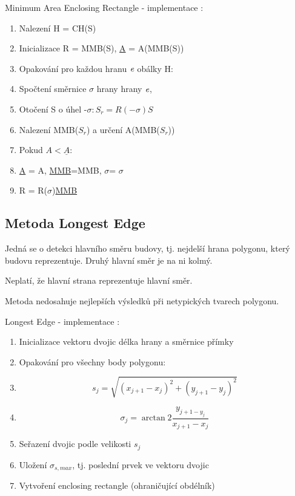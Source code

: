 \documentclass[oneside,12pt,a4paper]{book}
\begin{document}
\bigskip

Minimum Area Enclosing Rectangle - implementace $:$

\begin{enumerate}
\item Nalezení H = CH(S)
\item Inicializace R = MMB(S), \underline{A} = A(MMB(S))
\item Opakování pro každou hranu $\emph{e}$ obálky H:
\item \quad Spočtení směrnice $\sigma$ hrany hrany $\emph{e}$,
\item \quad Otočení S o úhel -$\sigma: S_r =R(-\sigma)S$
\item \quad Nalezení MMB($S_r$) a určení A(MMB($S_r$))
\item \quad Pokud $A < \underline{A}$:
\item \quad \quad \quad \underline{A} = A, \underline{MMB}=MMB, \underline{$\sigma$}= $\sigma$
\item R = R(\underline{$\sigma$})\underline{MMB}

\end{enumerate}

\bigskip

\subsection{Metoda Longest Edge}
Jedná se o detekci hlavního směru budovy, tj. nejdelší hrana polygonu, který budovu reprezentuje. Druhý hlavní směr je na ni kolmý.\par
Neplatí, že hlavní strana reprezentuje hlavní směr.\par
Metoda nedosahuje nejlepších výsledků při netypických tvarech polygonu.\par

\bigskip

Longest Edge - implementace $:$

\begin{enumerate}
\item Inicializace vektoru dvojic délka hrany a směrnice přímky
\item Opakování pro všechny body polygonu:
\item \quad \begin{equation}
    s_j = \sqrt{(x_{j+1}-x_j)^2 + (y_{j+1}-y_j)^2}
\end{equation}
\item \quad \quad \begin{equation}
    \sigma_j = \arctan2 \frac{y_{j+1-y_j}}{x_{j+1}-x_j}
\end{equation}
\item Seřazení dvojic podle velikosti $s_j$
\item Uložení $\sigma_{s,max}$, tj. poslední prvek ve vektoru dvojic
\item Vytvoření enclosing rectangle (ohraničující obdélník)
\end{enumerate}
\end{document}
